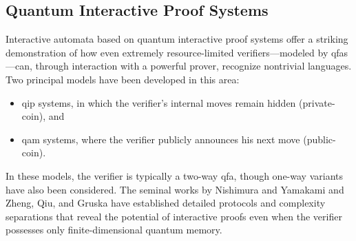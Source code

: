 \subsection{Quantum Interactive Proof Systems}
\label{sec:interactive-automata}

Interactive automata based on quantum interactive proof systems offer a striking demonstration of how even extremely resource-limited verifiers—modeled by \glspl{qfa}—can, through interaction with a powerful prover, recognize nontrivial languages. Two principal models have been developed in this area:
  
\begin{itemize}
  \item \gls{qip} systems, in which the verifier's internal moves remain hidden (private-coin), and
  \item \gls{qam} systems, where the verifier publicly announces his next move (public-coin).
\end{itemize}

In these models, the verifier is typically a two-way qfa, though one-way variants have also been considered. The seminal works by Nishimura and Yamakami \cite{nishimura2009application, nishimura2015interactive} and Zheng, Qiu, and Gruska \cite{zheng2015power} have established detailed protocols and complexity separations that reveal the potential of interactive proofs even when the verifier possesses only finite-dimensional quantum memory.

